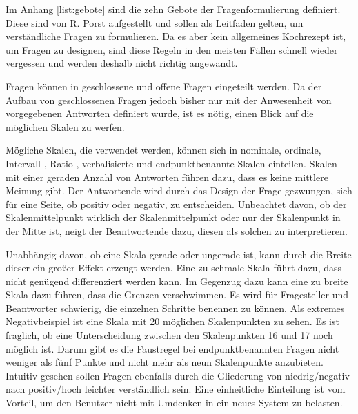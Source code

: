 Im Anhang \vref{list:gebote} sind die zehn Gebote der Fragenformulierung definiert\autocite{RolfPorst}. %
Diese sind von R. Porst aufgestellt und sollen als Leitfaden gelten, um verständliche Fragen zu formulieren.
Da es aber kein allgemeines Kochrezept ist, um Fragen zu designen, sind diese Regeln in den meisten Fällen schnell wieder vergessen und werden deshalb nicht richtig angewandt.%

Fragen können in geschlossene und offene Fragen eingeteilt werden.
Da der Aufbau von geschlossenen Fragen jedoch bisher nur mit der Anwesenheit von vorgegebenen Antworten definiert wurde, ist es nötig, einen Blick auf die möglichen Skalen zu werfen.

Mögliche Skalen, die verwendet werden, können sich in nominale, ordinale,\\
 Intervall-, Ratio-, verbalisierte und endpunktbenannte Skalen einteilen\autocite[S.71]{2014Fragebogen}. %
Skalen mit einer geraden Anzahl von Antworten führen dazu, dass es keine mittlere Meinung gibt. 
Der Antwortende wird durch das Design der Frage gezwungen, sich für eine Seite, ob positiv oder negativ, zu entscheiden.
Unbeachtet davon, ob der Skalenmittelpunkt wirklich der Skalenmittelpunkt oder nur der Skalenpunkt in der Mitte ist, neigt der Beantwortende dazu, diesen als solchen zu interpretieren\autocite[S.83]{2014Fragebogen}.%

Unabhängig davon, ob eine Skala gerade oder ungerade ist, kann durch die Breite dieser ein großer Effekt erzeugt werden. 
Eine zu schmale Skala führt dazu, dass nicht genügend differenziert werden kann.
Im Gegenzug dazu kann eine zu breite Skala dazu führen, dass die Grenzen verschwimmen.
Es wird für Fragesteller und Beantworter schwierig, die einzelnen Schritte benennen zu können. 
Als extremes Negativbeispiel ist eine Skala mit 20 möglichen Skalenpunkten zu sehen.
Es ist fraglich, ob eine Unterscheidung zwischen den Skalenpunkten 16 und 17 noch möglich ist.
Darum gibt es die Faustregel bei endpunktbenannten Fragen nicht weniger als fünf Punkte und nicht mehr als neun Skalenpunkte anzubieten\autocite[S.87]{2014Fragebogen}. %
Intuitiv gesehen sollen Fragen ebenfalls durch die Gliederung von niedrig/negativ nach positiv/hoch leichter verständlich sein. Eine einheitliche Einteilung ist vom Vorteil, um den Benutzer nicht mit Umdenken in ein neues System zu belasten\autocite[S.89/90]{2014Fragebogen}. %

